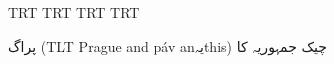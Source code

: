 \documentclass{article}
\def\textlatin#1{\bgroup\textdir TLT #1\egroup}
\begin{document}
\pagedir TRT \bodydir TRT \pardir TRT \textdir TRT

\noto
{}
پراگ (\textlatin{Prague and páv anیہthis}) چیک جمہوریہ کا%
\end{document}
